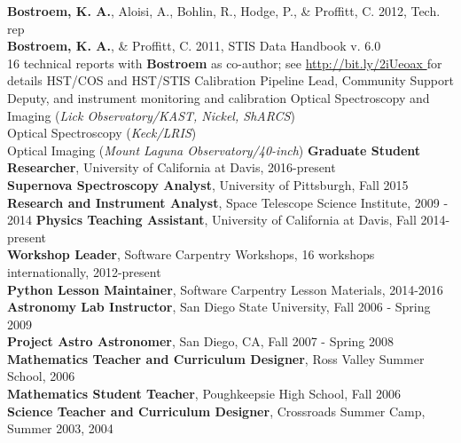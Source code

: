 \documentclass[10pt]{cv}
\begin{document}
\begin{llist}
{\bf Bostroem, K. A.}, Aloisi, A., Bohlin, R., Hodge, P., \& Proffitt, C. 2012, Tech. rep \\
{\bf Bostroem, K. A.}, \& Proffitt, C. 2011, STIS Data Handbook v. 6.0\\
16 technical reports with {\bf Bostroem} as co-author; see \color{blue}\url{http://bit.ly/2iUeoax }\color{black}\hspace*{0pt} for details
%
\vspace{-0.1in}   
HST/COS and HST/STIS Calibration Pipeline Lead, Community Support Deputy, and instrument monitoring and calibration
%
\vspace{-0.1in}   
Optical Spectroscopy and Imaging ({\it Lick Observatory/KAST, Nickel, ShARCS})\\
Optical Spectroscopy ({\it Keck/LRIS})\\
Optical Imaging ({\it Mount Laguna Observatory/40-inch})
%
\vspace{-0.1in}   
    {\bf Graduate Student Researcher}, University of California at Davis, 2016-present \\
    {\bf Supernova Spectroscopy Analyst}, University of Pittsburgh, Fall 2015 \\
    {\bf Research and Instrument Analyst}, Space Telescope Science Institute, 2009 - 2014 
%
\vspace{-0.1in}   
   {\bf Physics Teaching Assistant}, University of California at Davis, Fall 2014-present \\
   {\bf  Workshop Leader}, Software Carpentry Workshops, 16 workshops internationally, 2012-present \\	
   {\bf Python Lesson Maintainer}, Software Carpentry Lesson Materials, 2014-2016\\
   {\bf  Astronomy Lab Instructor}, San Diego State University, Fall 2006 - Spring 2009  \\
   {\bf Project Astro Astronomer}, San Diego, CA, Fall 2007 - Spring 2008 \\
   {\bf Mathematics Teacher and Curriculum Designer}, Ross Valley Summer School, 2006 \\
   {\bf Mathematics Student Teacher}, Poughkeepsie High School,  Fall 2006 \\
   {\bf Science Teacher and Curriculum Designer}, Crossroads Summer Camp, Summer 2003, 2004 \\
\end{llist}
\end{document}
